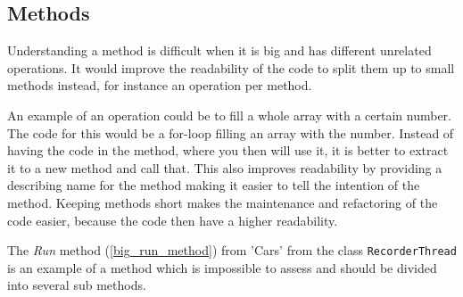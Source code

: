 \subsection{Methods}
Understanding a method is difficult when it is big and has different unrelated operations.
It would improve the readability of the code to split them up to small methods instead, for instance an operation per method.

An example of an operation could be to fill a whole array with a certain number.
The code for this would be a for-loop filling an array with the number.
Instead of having the code in the method, where you then will use it, it is better to extract it to a new method and call that.
This also improves readability by providing a describing name for the method making it easier to tell the intention of the method.
Keeping methods short makes the maintenance and refactoring of the code easier, because the code then have a higher readability.

The \textit{Run} method (\cref{big_run_method}) from 'Cars' from the class \lstinline!RecorderThread! is an example of a method which is impossible to assess and should be divided into several sub methods.